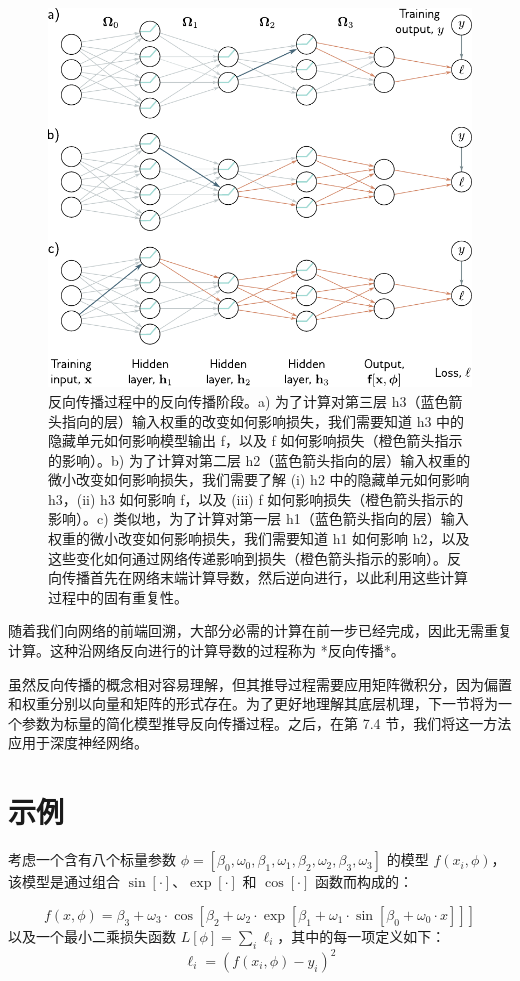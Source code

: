 \documentclass[lang=cn,newtx,10pt,scheme=chinese]{elegantbook}
\begin{document}
\begin{figure}[ht!]
\centering
\includegraphics[width=0.7\linewidth]{PDFFigures/UDLChap7PDF/Train2BPIntuitions2.pdf}
\caption{反向传播过程中的反向传播阶段。a) 为了计算对第三层 h3（蓝色箭头指向的层）输入权重的改变如何影响损失，我们需要知道 h3 中的隐藏单元如何影响模型输出 f，以及 f 如何影响损失（橙色箭头指示的影响）。b) 为了计算对第二层 h2（蓝色箭头指向的层）输入权重的微小改变如何影响损失，我们需要了解 (i) h2 中的隐藏单元如何影响 h3，(ii) h3 如何影响 f，以及 (iii) f 如何影响损失（橙色箭头指示的影响）。c) 类似地，为了计算对第一层 h1（蓝色箭头指向的层）输入权重的微小改变如何影响损失，我们需要知道 h1 如何影响 h2，以及这些变化如何通过网络传递影响到损失（橙色箭头指示的影响）。反向传播首先在网络末端计算导数，然后逆向进行，以此利用这些计算过程中的固有重复性。}
\end{figure}

随着我们向网络的前端回溯，大部分必需的计算在前一步已经完成，因此无需重复计算。这种沿网络反向进行的计算导数的过程称为 *反向传播*。


虽然反向传播的概念相对容易理解，但其推导过程需要应用矩阵微积分，因为偏置和权重分别以向量和矩阵的形式存在。为了更好地理解其底层机理，下一节将为一个参数为标量的简化模型推导反向传播过程。之后，在第 7.4 节，我们将这一方法应用于深度神经网络。
\section{示例}
考虑一个含有八个标量参数 \(\phi = [\beta_0, \omega_0, \beta_1, \omega_1, \beta_2, \omega_2, \beta_3, \omega_3]\) 的模型 \(f(x_i, \phi)\)，该模型是通过组合 \(\sin[\cdot]\)、\(\exp[\cdot]\) 和 \(\cos[\cdot]\) 函数而构成的：

\begin{equation}
f(x, \phi) = \beta_3 + \omega_3 \cdot \cos[\beta_2 + \omega_2 \cdot \exp[\beta_1 + \omega_1 \cdot \sin[\beta_0 + \omega_0 \cdot x]]] 
\end{equation}
以及一个最小二乘损失函数 \(L[\phi] = \sum_i \ell_i\)，其中的每一项定义如下：
\begin{equation}
\ell_i = (f(x_i, \phi) - y_i)^2 
\end{equation}
\end{document}
